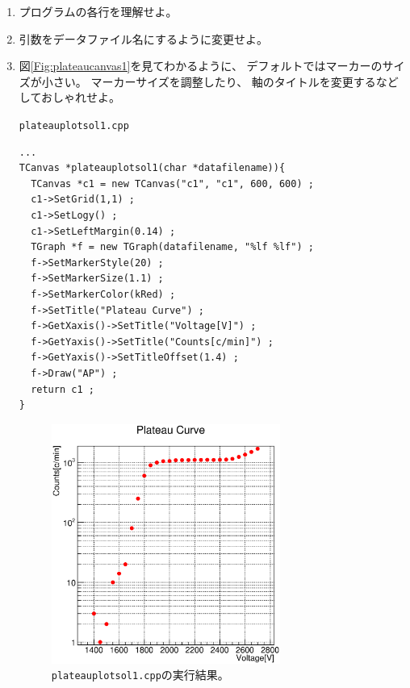 \begin{enumerate}
 \item プログラムの各行を理解せよ。
 \item 引数をデータファイル名にするように変更せよ。
 \item 図\ref{Fig:plateaucanvas1}を見てわかるように、
       デフォルトではマーカーのサイズが小さい。
       マーカーサイズを調整したり、
       軸のタイトルを変更するなどしておしゃれせよ。
         \begin{itembox}{\texttt{plateauplotsol1.cpp}}
\begin{verbatim}
...
TCanvas *plateauplotsol1(char *datafilename)){
  TCanvas *c1 = new TCanvas("c1", "c1", 600, 600) ;
  c1->SetGrid(1,1) ;
  c1->SetLogy() ;
  c1->SetLeftMargin(0.14) ;
  TGraph *f = new TGraph(datafilename, "%lf %lf") ;
  f->SetMarkerStyle(20) ;
  f->SetMarkerSize(1.1) ;
  f->SetMarkerColor(kRed) ;
  f->SetTitle("Plateau Curve") ;
  f->GetXaxis()->SetTitle("Voltage[V]") ;
  f->GetYaxis()->SetTitle("Counts[c/min]") ;
  f->GetYaxis()->SetTitleOffset(1.4) ;
  f->Draw("AP") ;
  return c1 ;
}
\end{verbatim}
  \end{itembox}
\begin{figure}[htbp]
   \begin{center}
    \includegraphics[width = 75mm]{./picture/plateaucanvas2.eps}
   \end{center}
   \caption{\texttt{plateauplotsol1.cpp}の実行結果。}
   \label{Fig:plateaucanvas2}
\end{figure}
\end{enumerate}



 
 
